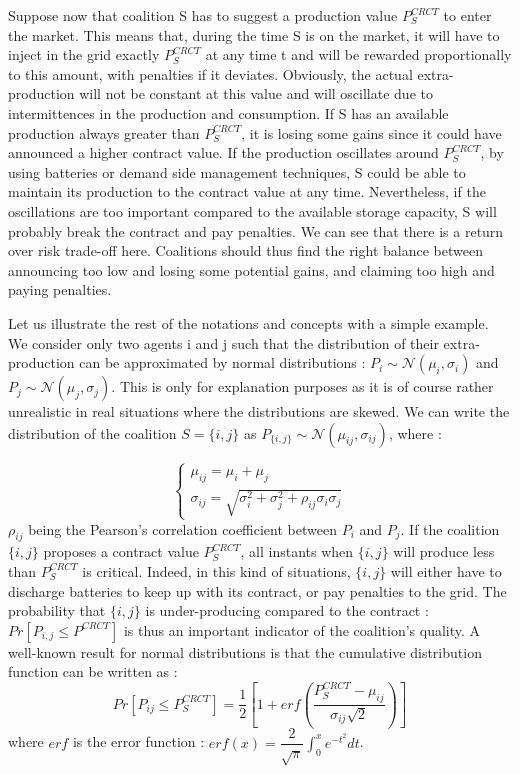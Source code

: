 \documentclass[journal]{IEEEtran}
\begin{document}
Suppose now that coalition S has to suggest a production value $ P_{S}^{CRCT} $ to enter the market. This means that, during the time S is on the market, it will have to inject in the grid exactly $ P_{S}^{CRCT} $ at any time t and will be rewarded proportionally to this amount, with penalties if it deviates. Obviously, the actual extra-production will not be constant at this value and will oscillate due to intermittences in the production and consumption. If S has an available production always greater than $ P_{S}^{CRCT} $, it is losing some gains since it could have announced a higher contract value. If the production oscillates around $ P_{S}^{CRCT} $, by using batteries or demand side management techniques, S could be able to maintain its production to the contract value at any time. Nevertheless, if the oscillations are too important compared to the available storage capacity, S will probably break the contract and pay penalties. We can see that there is a return over risk trade-off here. Coalitions should thus find the right balance between announcing too low and losing some potential gains, and claiming too high and paying penalties. 

Let us illustrate the rest of the notations and concepts with a simple example. We consider only two agents i and j such that the distribution of their extra-production can be approximated by normal distributions : $ P_{i} \sim \mathcal{N}(\mu_{i}, \sigma_{i} ) $ and $ P_{j} \sim \mathcal{N}(\mu_{j}, \sigma_{j} ) $. This is only for explanation purposes as it is of course rather unrealistic in real situations where the distributions are skewed. We can write the distribution of the coalition $ S = \{i,j\} $ as $ P_{\{i,j\}} \sim \mathcal{N}(\mu_{ij}, \sigma_{ij}) $, where :

\begin{equation}
\left\{ \begin{array}{lll}
		\mu_{ij} = \mu_{i} + \mu_{j} \\
		\sigma_{ij} = \sqrt{\sigma_{i}^{2} + \sigma_{j}^{2} + \rho_{ij} \sigma_{i} \sigma_{j} }
\end{array} \right.
\end{equation}
$ \rho_{ij} $ being the Pearson's correlation coefficient between $ P_{i} $ and $ P_{j} $. If the coalition $ \{i,j\}$ proposes a contract value $ P_{S}^{CRCT} $, all instants when $ \{i,j\}$ will produce less than $ P_{S}^{CRCT} $ is critical. Indeed, in this kind of situations, $ \{i,j\}$ will either have to discharge batteries to keep up with its contract, or pay penalties to the grid. The probability that $ \{i,j\}$ is under-producing compared to the contract : $ Pr[P_{i,j} \leq P^{CRCT}] $ is thus an important indicator of the coalition's quality. A well-known result for normal distributions is that the cumulative distribution function can be written as :
\begin{equation}
Pr[P_{ij} \leq P_{S}^{CRCT}] = \dfrac{1}{2} \left[ 1+ erf \left( \dfrac{P_{S}^{CRCT} - \mu_{ij}}{\sigma_{ij}\sqrt{2}} \right) \right] 
\end{equation}
where $ erf $ is the error function : $ erf(x) = \dfrac{2}{\sqrt{\pi}}\int_{0}^{x} e^{-t^{2}} dt $.
\end{document}
